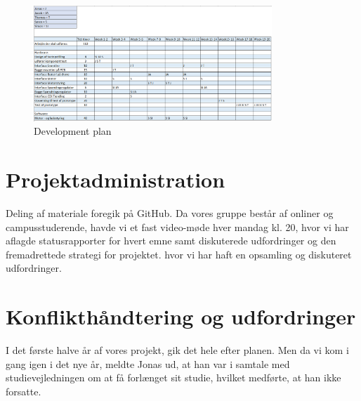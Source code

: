 
\begin{figure}[h]
  \centering
  \includegraphics[width=0.8\textwidth]{./figurer/p1.png}
  \caption{Development plan}
  \label{fig:p1}
\end{figure}


\section{Projektadministration}
\label{sec:proj-}

Deling af materiale foregik på GitHub.%
Da vores gruppe består af onliner og campusstuderende, havde vi et fast video-møde hver mandag kl. 20, hvor vi har aflagde statusrapporter for hvert emne samt diskuterede udfordringer og den fremadrettede strategi for projektet. hvor vi har haft en opsamling og diskuteret udfordringer.

\section{Konflikthåndtering og udfordringer}
\label{sec:konfl-}

I det første halve år af vores projekt, gik det hele efter planen. Men da vi kom i gang igen i det nye år, meldte Jonas ud, at han var i samtale med studievejledningen om at få forlænget sit studie, hvilket medførte, at han ikke forsatte. 

